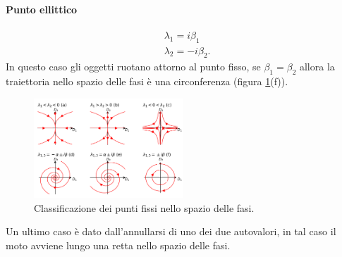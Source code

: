 \paragraph{Punto ellittico}%
\label{par:Punto ellittico}
\[\begin{aligned}
    & \lambda_1 = i\beta_1\\
    & \lambda_2= -i\beta_2
.\end{aligned}\]
In questo caso gli oggetti ruotano attorno al punto fisso, se $\beta_1=\beta_2$ allora la traiettoria nello spazio delle fasi è una circonferenza (figura \ref{fig:figures-15_lambda-png}(f)).
\begin{figure}[H]
    \centering
    \includegraphics[width=0.5\textwidth]{figures/15_lambda.png}
    \caption{\scriptsize Classificazione dei punti fissi nello spazio delle fasi.}
    \label{fig:figures-15_lambda-png}
\end{figure}
\noindent
Un ultimo caso è dato dall'annullarsi di uno dei due autovalori, in tal caso il moto avviene lungo una retta nello spazio delle fasi.
